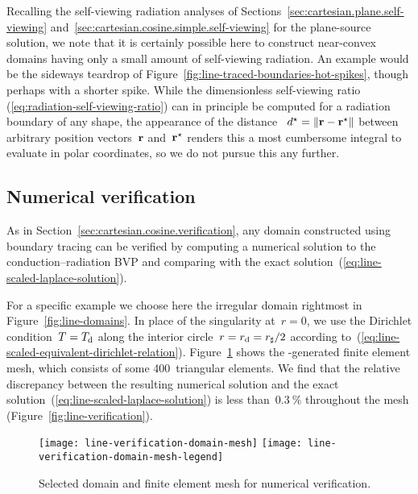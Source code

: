 Recalling the self-viewing radiation analyses
of Sections~\ref{sec:cartesian.plane.self-viewing}
and~\ref{sec:cartesian.cosine.simple.self-viewing}
for the plane-source solution,
we note that it is certainly possible here
to construct near-convex domains
having only a small amount of self-viewing radiation.
An example would be the sideways teardrop
of Figure~\ref{fig:line-traced-boundaries-hot-spikes},
though perhaps with a shorter spike.
While the dimensionless self-viewing ratio~%
  (\ref{eq:radiation-self-viewing-ratio})
can in principle be computed for a radiation boundary of any shape,
the appearance of the distance~%
  $d^\star = \lVert\boldsymbol{\mathbf{r}} - \boldsymbol{\mathbf{r}}^\star\rVert$
between arbitrary position vectors~$\boldsymbol{\mathbf{r}}$ and~$\boldsymbol{\mathbf{r}}^\star$
renders this a most cumbersome integral to evaluate in polar coordinates,
so we do not pursue this any further.

\subsection{Numerical verification}
\label{sec:polar.convex.verification}

As in Section~\ref{sec:cartesian.cosine.verification},
any domain constructed using boundary tracing can be verified
by computing a numerical solution to the conduction--radiation BVP
and comparing with the exact solution~(\ref{eq:line-scaled-laplace-solution}).

For a specific example we choose here
the irregular domain rightmost in Figure~\ref{fig:line-domains}.
In place of the singularity at~$r = 0$,
we use the Dirichlet condition~$T = T_{\mathrm{d}}$
along the interior circle~$r = r_{\mathrm{d}} = r_\sharp / 2$
according to~(\ref{eq:line-scaled-equivalent-dirichlet-relation}).
Figure~\ref{fig:line-verification-domain-mesh}
shows the -generated finite element mesh,
which consists of some 400~triangular elements.
We find that the relative discrepancy
between the resulting numerical solution
and the exact solution~(\ref{eq:line-scaled-laplace-solution})
is less than~$\SI{0.3}{\percent}$ throughout the mesh
(Figure~\ref{fig:line-verification}).

\begin{figure}
  \centering
  \texttt{[image: line-verification-domain-mesh]}
  \texttt{[image: line-verification-domain-mesh-legend]}
  \caption{
    Selected domain and finite element mesh for numerical verification.
  }
  \label{fig:line-verification-domain-mesh}
\end{figure}

